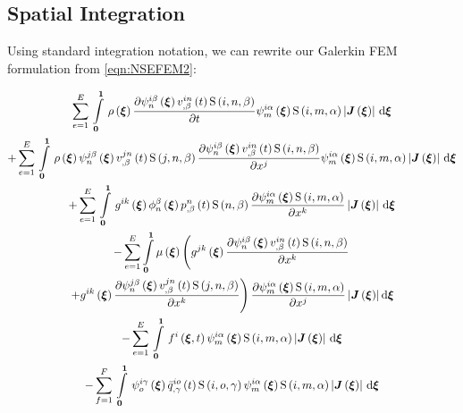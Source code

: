 \subsection{Spatial Integration}

Using standard integration notation, we can rewrite our Galerkin FEM
formulation from \ref{eqn:NSEFEM2}:

\begin{multline}
  \gsum{e=1}{E}{\gint{\vectr{0}}{\vectr{1}}{\fnof{\rho}{\vectr{\xi}}\delby{\idxgbfn{i}{n}{\beta}{\vectr{\xi}}
  \fnof{\idxnodedof{v}{i}{n}{\beta}}{t}\idxgsf{i}{n}{\beta}}{t}\idxgbfn{i}{m}{\alpha}{\vectr{\xi}}\idxgsf{i}{m}{\alpha}\abs{\fnof{\matr{J}}{\vectr{\xi}}}}{\vectr{\xi}}}\\
  +\gsum{e=1}{E}{\gint{\vectr{0}}{\vectr{1}}{\fnof{\rho}{\vectr{\xi}}\idxgbfn{j}{n}{\beta}{\vectr{\xi}}
  \fnof{\idxnodedof{v}{j}{n}{\beta}}{t}\idxgsf{j}{n}{\beta}\delby{\idxgbfn{i}{n}{\beta}{\vectr{\xi}}
  \fnof{\idxnodedof{v}{i}{n}{\beta}}{t}\idxgsf{i}{n}{\beta}}{x^{j}}\idxgbfn{i}{m}{\alpha}{\vectr{\xi}}\idxgsf{i}{m}{\alpha}\abs{\fnof{\matr{J}}{\vectr{\xi}}}}{\vectr{\xi}}}\\
  +\gsum{e=1}{E}{\gint{\vectr{0}}{\vectr{1}}{\fnof{g^{ik}}{\vectr{\xi}}\altgbfn{n}{\beta}{\vectr{\xi}}
  \fnof{\nodedof{p}{n}{\beta}}{t}\gsf{n}{\beta}\delby{\idxgbfn{i}{m}{\alpha}{\vectr{\xi}}\idxgsf{i}{m}{\alpha}}{x^{k}}\abs{\fnof{\matr{J}}{\vectr{\xi}}}}{\vectr{\xi}}}\\
  -\dsuml{e=1}{E}\dintl{\vectr{0}}{\vectr{1}}\fnof{\mu}{\vectr{\xi}}\left(\fnof{g^{jk}}{\vectr{\xi}}\delby{\idxgbfn{i}{n}{\beta}{\vectr{\xi}}
      \fnof{\idxnodedof{v}{i}{n}{\beta}}{t}\idxgsf{i}{n}{\beta}}{x^{k}}\right.\\
    \left.+\fnof{g^{ik}}{\vectr{\xi}}\delby{\idxgbfn{j}{n}{\beta}{\vectr{\xi}}
  \fnof{\idxnodedof{v}{j}{n}{\beta}}{t}\idxgsf{j}{n}{\beta}}{x^{k}}\right)\delby{\idxgbfn{i}{m}{\alpha}{\vectr{\xi}}\idxgsf{i}{m}{\alpha}}{x^{j}}\abs{\fnof{\matr{J}}{\vectr{\xi}}}\exteriorderiv{\vectr{\xi}} \\
  -\gsum{e=1}{E}{\gint{\vectr{0}}{\vectr{1}}{\fnof{f^{i}}{\vectr{\xi},t}\idxgbfn{i}{m}{\alpha}{\vectr{\xi}}\idxgsf{i}{m}{\alpha}\abs{\fnof{\matr{J}}{\vectr{\xi}}}}{\vectr{\xi}}}\\
  -\gsum{f=1}{F}{\gint{\vectr{0}}{\vectr{1}}{\idxgbfn{i}{o}{\gamma}{\vectr{\xi}}
      \fnof{\idxnodedof{\bar{q}}{i}{o}{\gamma}}{t}\idxgsf{i}{o}{\gamma}\idxgbfn{i}{m}{\alpha}{\vectr{\xi}}\idxgsf{i}{m}{\alpha}\abs{\fnof{\matr{J}}{\vectr{\xi}}}}{\vectr{\xi}}}\\

\end{multline}

